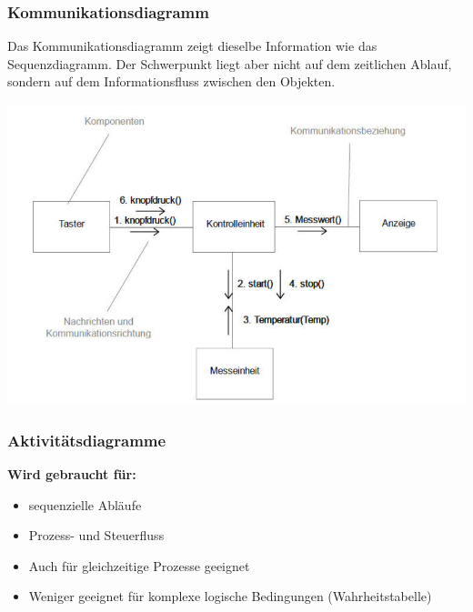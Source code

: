 \newpage
\subsubsection{Kommunikationsdiagramm}
\begin{minipage}[][][t]{0.4\linewidth}
Das Kommunikationsdiagramm zeigt dieselbe Information wie das Sequenzdiagramm. Der Schwerpunkt liegt aber
nicht auf dem zeitlichen Ablauf, sondern auf dem Informationsfluss zwischen den Objekten.
\end{minipage}%
\begin{minipage}{0.6\linewidth}
\begin{center}
\includegraphics[width=0.8\linewidth]{images/Modellierung/Kommunikationsdiagramm}
\end{center}
\end{minipage}

\subsubsection{Aktivitätsdiagramme}
\textbf{Wird gebraucht für:}
\begin{itemize}
	\item sequenzielle Abläufe
	\item Prozess- und Steuerfluss
	\item Auch für gleichzeitige Prozesse geeignet
	\item Weniger geeignet für komplexe logische Bedingungen (Wahrheitstabelle)
\end{itemize}

